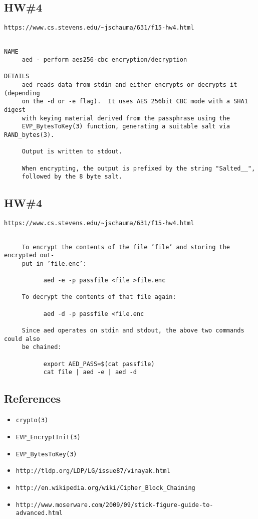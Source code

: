 \documentclass[xga]{xdvislides}
\begin{document}
\subsection{HW\#4}
\begin{verbatim}
https://www.cs.stevens.edu/~jschauma/631/f15-hw4.html
\end{verbatim}
\begin{verbatim}

NAME
     aed - perform aes256‐cbc encryption/decryption

DETAILS
     aed reads data from stdin and either encrypts or decrypts it (depending
     on the -d or -e flag).  It uses AES 256bit CBC mode with a SHA1 digest
     with keying material derived from the passphrase using the
     EVP_BytesToKey(3) function, generating a suitable salt via RAND_bytes(3).

     Output is written to stdout.

     When encrypting, the output is prefixed by the string "Salted__",
     followed by the 8 byte salt.
\end{verbatim}
\Normalsize

\subsection{HW\#4}
\begin{verbatim}
https://www.cs.stevens.edu/~jschauma/631/f15-hw4.html
\end{verbatim}
\begin{verbatim}

     To encrypt the contents of the file ’file’ and storing the encrypted out-
     put in ’file.enc’:

           aed -e -p passfile <file >file.enc

     To decrypt the contents of that file again:

           aed -d -p passfile <file.enc

     Since aed operates on stdin and stdout, the above two commands could also
     be chained:

           export AED_PASS=$(cat passfile)
           cat file | aed -e | aed -d
\end{verbatim}
\Normalsize

\subsection{References}
\begin{itemize}
	\item {\tt crypto(3)}
	\item {\tt EVP\_EncryptInit(3)}
	\item {\tt EVP\_BytesToKey(3)}
	\item {\tt http://tldp.org/LDP/LG/issue87/vinayak.html}
	\item {\tt http://en.wikipedia.org/wiki/Cipher\_Block\_Chaining}
	\item {\tt http://www.moserware.com/2009/09/stick-figure-guide-to-advanced.html}
\end{itemize}
\end{document}

